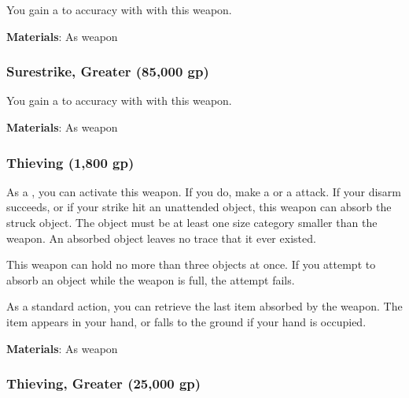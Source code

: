 You gain a   to accuracy with  with this weapon.



\vspace{0.25em}
\textbf{Materials}: As weapon


\lowercase{\hypertarget{item:Surestrike, Greater}{}}\label{item:Surestrike, Greater}
\hypertarget{item:Surestrike, Greater}{\subsubsection{Surestrike, Greater\hfill{} (85,000 gp)}}

You gain a   to accuracy with  with this weapon.



\vspace{0.25em}
\textbf{Materials}: As weapon


\lowercase{\hypertarget{item:Thieving}{}}\label{item:Thieving}
\hypertarget{item:Thieving}{\subsubsection{Thieving\hfill{} (1,800 gp)}}

As a , you can activate this weapon.
If you do, make a  or a  attack.
If your disarm succeeds, or if your strike hit an unattended object, this weapon can absorb the struck object.
The object must be at least one size category smaller than the weapon.
An absorbed object leaves no trace that it ever existed.

This weapon can hold no more than three objects at once.
If you attempt to absorb an object while the weapon is full, the attempt fails.

As a standard action, you can retrieve the last item absorbed by the weapon.
The item appears in your hand, or falls to the ground if your hand is occupied.



\vspace{0.25em}
\textbf{Materials}: As weapon


\lowercase{\hypertarget{item:Thieving, Greater}{}}\label{item:Thieving, Greater}
\hypertarget{item:Thieving, Greater}{\subsubsection{Thieving, Greater\hfill{} (25,000 gp)}}

